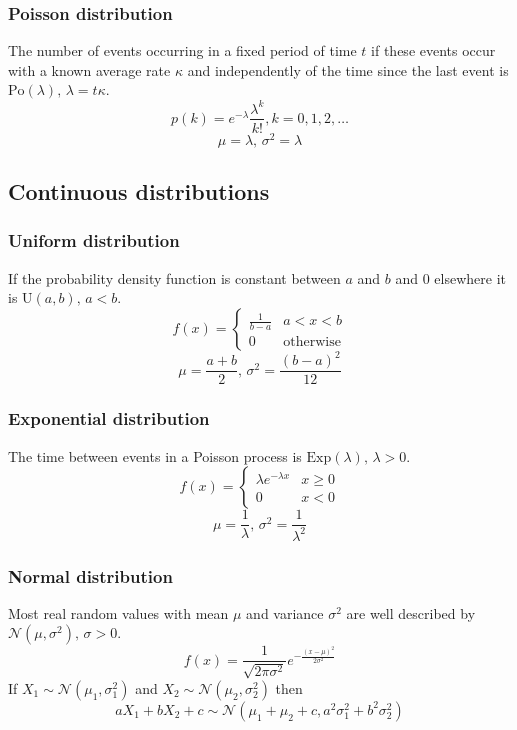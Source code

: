 \subsubsection{Poisson distribution}
The number of events occurring in a fixed period of time $t$ if these events
occur with a known average rate $\kappa$ and independently of the time since
the last event is $\textrm{Po}(\lambda),\,\lambda=t\kappa$.
\[p(k)=e^{-\lambda}\frac{\lambda^k}{k!}, k=0,1,2,\dots\]
\[\mu=\lambda,\,\sigma^2=\lambda\]

\subsection{Continuous distributions}

\subsubsection{Uniform distribution}
If the probability density function is constant between $a$ and $b$ and 0
elsewhere it is $\textrm{U}(a,b),\,a<b$.
\[f(x) = \left\{
     \begin{array}{cl}
          \frac{1}{b-a} & a<x<b              \\
          0             & \textrm{otherwise}
     \end{array}\right.\]
\[\mu=\frac{a+b}{2},\,\sigma^2=\frac{(b-a)^2}{12}\]

\subsubsection{Exponential distribution}
The time between events in a Poisson process is
$\textrm{Exp}(\lambda),\,\lambda>0$.
\[f(x) = \left\{
     \begin{array}{cl}
          \lambda e^{-\lambda x} & x\geq0 \\
          0                      & x<0
     \end{array}\right.\]
\[\mu=\frac{1}{\lambda},\,\sigma^2=\frac{1}{\lambda^2}\]

\subsubsection{Normal distribution}
Most real random values with mean $\mu$ and variance $\sigma^2$ are well
described by $\mathcal{N}(\mu,\sigma^2),\,\sigma>0$.
\[ f(x) = \frac{1}{\sqrt{2\pi\sigma^2}}e^{-\frac{(x-\mu)^2}{2\sigma^2}} \]
If $X_1 \sim \mathcal{N}(\mu_1,\sigma_1^2)$ and $X_2 \sim
     \mathcal{N}(\mu_2,\sigma_2^2)$ then
\[ aX_1 + bX_2 + c \sim \mathcal{N}(\mu_1+\mu_2+c,a^2\sigma_1^2+b^2\sigma_2^2) \]

